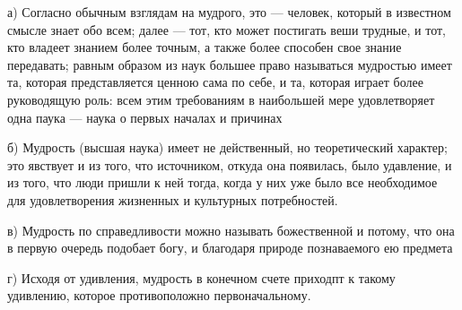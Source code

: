 \documentclass{article}
\begin{document}
а) Согласно обычным взглядам на мудрого, это --- человек, который в известном смысле знает обо всем; далее --- тот, кто может постигать веши трудные, и тот, кто владеет знанием более точным, а также более способен свое знание передавать; равным образом из наук большее право называться мудростью имеет та, которая представляется ценною сама по себе, и та, которая играет более руководящую роль: всем этим требованиям в наибольшей мере удовлетворяет одна паука --- наука о первых началах и причинах

б) Мудрость (высшая наука) имеет не действенный, но теоретический характер; это явствует и из того, что источником, откуда она появилась, было удавление, и из того, что люди пришли к ней тогда, когда у них уже было все необходимое для удовлетворения жизненных и культурных потребностей.

в) Мудрость по справедливости можно называть божественной и потому, что она в первую очередь подобает богу, и благодаря природе познаваемого ею предмета

г) Исходя от удивления, мудрость в конечном счете приходпт к такому удивлению, которое противоположно первоначальному.
\end{document}
